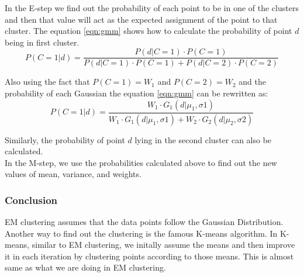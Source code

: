 \documentclass[journal, compsoc]{IEEEtran}
\begin{document}
In the E-step we find out the probability of each point to be in one of the clusters and then that value will act as the expected assignment
of the point to that cluster. The equation \ref{eqn:gmm} shows how to calculate the probability of point $d$ being in first cluster.
\begin{equation}
\label{eqn:gmm}
P(C = 1 | d) = \frac{P(d | C = 1)\cdot P(C = 1)}{P(d | C = 1)\cdot P(C = 1) + P(d | C = 2)\cdot P(C = 2)}
\end{equation}

Also using the fact that $P(C = 1) = W_{1}$ and $P(C = 2) = W_{2}$ and the probability of each Gaussian the equation \ref{eqn:gmm} can be
rewritten as:
\begin{equation}
\label{eqn:gmmfinal}
P(C = 1 | d) = \frac{W_{1} \cdot G_{1}(d | \mu_{1}, \sigma{1})}{W_1\cdot G_{1}(d | \mu_{1}, \sigma{1}) + W_2\cdot G_{2}(d | \mu_{2}, \sigma{2})}
\end{equation}

Similarly, the probability of point $d$ lying in the second cluster can also be calculated.\\

In the M-step, we use the probabilities calculated above to find out the new values of mean, variance, and weights.

\subsubsection{Conclusion}
EM clustering assumes that the data points follow the Gaussian Distribution. Another way to find out the clustering is the famous K-means algorithm.
In K-means, similar to EM clustering, we initally assume the means and then improve it in each iteration by clustering points according to those means.
This is almost same as what we are doing in EM clustering.
\end{document}
